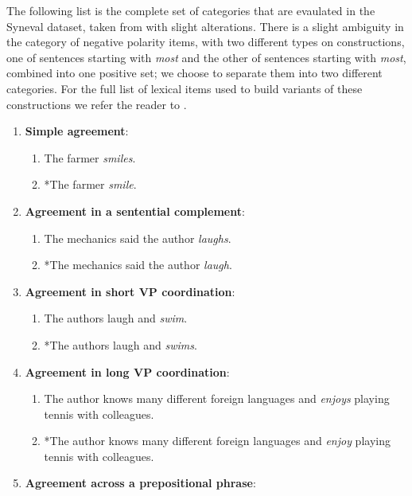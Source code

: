 % 

The following list is the complete set of categories that are evaulated in the Syneval dataset, taken from \citet{linzen2018targeted} with slight alterations. There is a slight ambiguity in the category of negative polarity items, with two different types on constructions, one of sentences starting with \textit{most} and the other of sentences starting with \textit{most}, combined into one positive set; we choose to separate them into two different categories. For the full list of lexical items used to build variants of these constructions we refer the reader to \citet{linzen2018targeted}.

\begin{enumerate}[noitemsep]
  \item \textbf{Simple agreement}:
    \begin{enumerate}
      \item The farmer \textit{smiles}.
      \item *The farmer \textit{smile}.
    \end{enumerate}
  \item \textbf{Agreement in a sentential complement}:
    \begin{enumerate}
      \item The mechanics said the author \textit{laughs}.
      \item *The mechanics said the author \textit{laugh}.
    \end{enumerate}
  \item \textbf{Agreement in short VP coordination}:
    \begin{enumerate}
      \item The authors laugh and \textit{swim}.
      \item *The authors laugh and \textit{swims}.
    \end{enumerate}
  \item \textbf{Agreement in long VP coordination}:
    \begin{enumerate}
      \item The author knows many different foreign languages and \textit{enjoys} playing tennis with colleagues.
      \item *The author knows many different foreign languages and \textit{enjoy} playing tennis with colleagues.
    \end{enumerate}
  \item \textbf{Agreement across a prepositional phrase}:
    \begin{enumerate}

\end{enumerate}
\end{enumerate}
